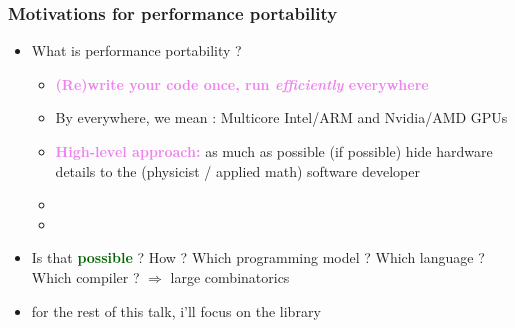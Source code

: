 \begin{frame}
  \frametitle{Motivations for performance portability}

  \begin{itemize}
  \item {\Large What is performance portability ?}
    \begin{itemize}
    \item \textcolor{violet}{\large \bf (Re)write your code once, run {\it efficiently} everywhere}
    \item By everywhere, we mean : Multicore Intel/ARM and Nvidia/AMD GPUs
    \item \textcolor{violet}{\bf High-level approach:} as much as possible (if possible) hide hardware details to the (physicist / applied math) software developer
    \item {}
    \item {}
    \end{itemize}
  \item {\large Is that \textcolor{darkgreen}{\bf possible} ? How ? Which programming model ? Which language ? Which compiler ? $\Rightarrow$ large combinatorics}
  \item for the rest of this talk, i'll focus on the  library
  \end{itemize}

\end{frame}

